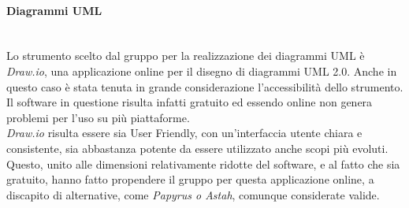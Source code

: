 \paragraph{Diagrammi UML} \-\\
Lo strumento scelto dal gruppo per la realizzazione dei diagrammi UML è \textit{Draw.io}, una applicazione online per il disegno di diagrammi UML 2.0. Anche in questo caso è stata tenuta in grande considerazione l'accessibilità dello strumento. Il software in questione risulta infatti gratuito ed essendo online non genera problemi per l'uso su più piattaforme.\\
\textit{Draw.io} risulta essere sia User Friendly, con un'interfaccia utente chiara e consistente, sia abbastanza potente da essere utilizzato anche scopi più evoluti. Questo, unito alle dimensioni relativamente ridotte del software, e al fatto che sia gratuito, hanno fatto propendere il gruppo per questa applicazione online, a discapito di alternative, come \textit{Papyrus o Astah}, comunque considerate valide.

